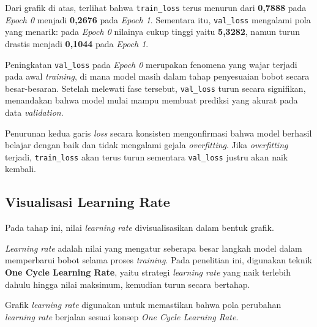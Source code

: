 Dari grafik di atas, terlihat bahwa \texttt{train\_loss} terus menurun dari \textbf{0,7888} pada \textit{Epoch 0} menjadi \textbf{0,2676} pada \textit{Epoch 1}. Sementara itu, \texttt{val\_loss} mengalami pola yang menarik: pada \textit{Epoch 0} nilainya cukup tinggi yaitu \textbf{5,3282}, namun turun drastis menjadi \textbf{0,1044} pada \textit{Epoch 1}.

Peningkatan \texttt{val\_loss} pada \textit{Epoch 0} merupakan fenomena yang wajar terjadi pada awal \textit{training}, di mana model masih dalam tahap penyesuaian bobot secara besar-besaran. Setelah melewati fase tersebut, \texttt{val\_loss} turun secara signifikan, menandakan bahwa model mulai mampu membuat prediksi yang akurat pada data \textit{validation}.

Penurunan kedua garis \textit{loss} secara konsisten mengonfirmasi bahwa model berhasil belajar dengan baik dan tidak mengalami gejala \textit{overfitting}. Jika \textit{overfitting} terjadi, \texttt{train\_loss} akan terus turun sementara \texttt{val\_loss} justru akan naik kembali.

\subsection{Visualisasi Learning Rate}

Pada tahap ini, nilai \textit{learning rate} divisualisasikan dalam bentuk grafik.

\textit{Learning rate} adalah nilai yang mengatur seberapa besar langkah model dalam memperbarui bobot selama proses \textit{training}. Pada penelitian ini, digunakan teknik \textbf{One Cycle Learning Rate}, yaitu strategi \textit{learning rate} yang naik terlebih dahulu hingga nilai maksimum, kemudian turun secara bertahap.

Grafik \textit{learning rate} digunakan untuk memastikan bahwa pola perubahan \textit{learning rate} berjalan sesuai konsep \textit{One Cycle Learning Rate}.

